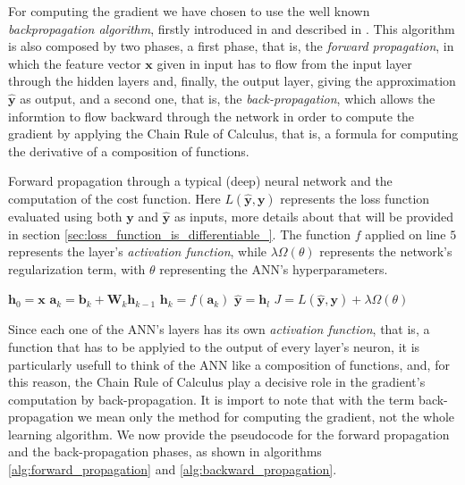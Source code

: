 		For computing the gradient we have chosen to use
		the well known \textit{backpropagation algorithm}, firstly introduced in \cite{10028086174} and described
		in \cite{Goodfellow-et-al-2016,haykin2009neural,mitchell1997machine}. This algorithm is
		also composed by two phases, a first phase, that is, the \textit{forward propagation}, in which the
		feature vector $\mathbf{x}$ given in input has to flow from the input layer through the hidden layers and,
		finally, the output layer, giving the approximation $\hat{\mathbf{y}}$ as output, and a second one, that
		is, the \textit{back-propagation}, which allows the informtion to flow backward through the network in
		order to compute the gradient by applying the Chain Rule of Calculus, that is, a formula for computing the
		derivative of a composition of functions.

		\begin{algorithm}[H]
			\caption{Forward propagation through a typical (deep) neural network and the computation of the cost
			function. Here $L(\hat{\mathbf{y}}, \mathbf{y})$ represents the loss function evaluated using both
			$\mathbf{y}$ and $\hat{\mathbf{y}}$ as inputs, more details about that will be provided in
			section \ref{sec:loss_function_is_differentiable_}. The function $f$ applied on line $5$ represents
			the layer's \textit{activation function}, while $\lambda \Omega(\theta)$ represents the
			network's regularization term, with $\theta$ representing the ANN's hyperparameters.}
			\label{alg:forward_propagation}
			\begin{algorithmic}[1]
					\State $\mathbf{h}_{0} = \mathbf{x}$
						\State $\mathbf{a}_{k} = \mathbf{b}_{k} + \mathbf{W}_{k}\mathbf{h}_{k - 1}$
						\State $\mathbf{h}_{k} = f(\mathbf{a}_{k})$
					\EndFor
					\State $\hat{\mathbf{y}} = \mathbf{h}_{l}$
					\State $J = L(\hat{\mathbf{y}}, \mathbf{y}) + \lambda \Omega(\theta)$
				\EndProcedure
			\end{algorithmic}
		\end{algorithm}

		Since each one of the ANN's layers has its own
		\textit{activation function}, that is, a function that has to be applyied to the output of every layer's
		neuron, it is particularly usefull to think of the ANN like a composition of functions, and, for this
		reason, the Chain Rule of Calculus play a decisive role in the gradient's computation by back-propagation.
		It is import to note that with the term back-propagation we mean
		only the method for computing the gradient, not the whole learning algorithm. We now provide the
		pseudocode for the forward propagation and the back-propagation phases, as shown in algorithms
		\ref{alg:forward_propagation} and \ref{alg:backward_propagation}.

